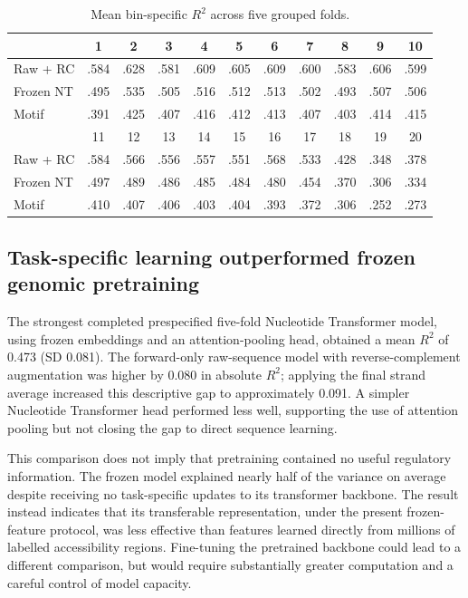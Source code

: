 \documentclass[a4paper,12pt]{article}
\begin{document}
\begin{table}[htb]
\centering
\caption{Mean bin-specific $R^2$ across five grouped folds.}
\label{tab:bins}
\begin{tabular}{lcccccccccc}
\toprule
& 1 & 2 & 3 & 4 & 5 & 6 & 7 & 8 & 9 & 10 \\
\midrule
Raw + RC & .584 & .628 & .581 & .609 & .605 & .609 & .600 & .583 & .606 & .599 \\
Frozen NT & .495 & .535 & .505 & .516 & .512 & .513 & .502 & .493 & .507 & .506 \\
Motif & .391 & .425 & .407 & .416 & .412 & .413 & .407 & .403 & .414 & .415 \\
\midrule
& 11 & 12 & 13 & 14 & 15 & 16 & 17 & 18 & 19 & 20 \\
\midrule
Raw + RC & .584 & .566 & .556 & .557 & .551 & .568 & .533 & .428 & .348 & .378 \\
Frozen NT & .497 & .489 & .486 & .485 & .484 & .480 & .454 & .370 & .306 & .334 \\
Motif & .410 & .407 & .406 & .403 & .404 & .393 & .372 & .306 & .252 & .273 \\
\bottomrule
\end{tabular}
\end{table}

\subsection{Task-specific learning outperformed frozen genomic pretraining}

The strongest completed prespecified five-fold Nucleotide Transformer model, using frozen embeddings and an attention-pooling head, obtained a mean $R^2$ of 0.473 (SD 0.081). The forward-only raw-sequence model with reverse-complement augmentation was higher by 0.080 in absolute $R^2$; applying the final strand average increased this descriptive gap to approximately 0.091. A simpler Nucleotide Transformer head performed less well, supporting the use of attention pooling but not closing the gap to direct sequence learning.

This comparison does not imply that pretraining contained no useful regulatory information. The frozen model explained nearly half of the variance on average despite receiving no task-specific updates to its transformer backbone. The result instead indicates that its transferable representation, under the present frozen-feature protocol, was less effective than features learned directly from millions of labelled accessibility regions. Fine-tuning the pretrained backbone could lead to a different comparison, but would require substantially greater computation and a careful control of model capacity.
\end{document}
